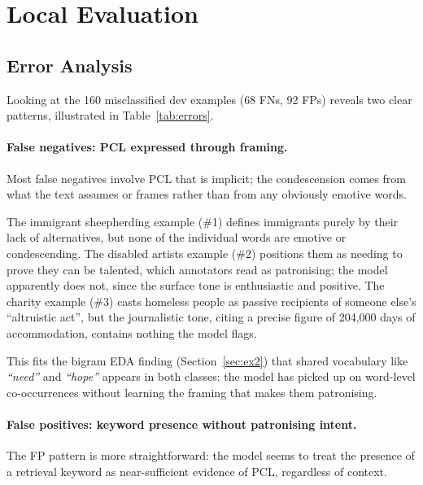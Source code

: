 \documentclass[11pt,a4paper]{article}
\begin{document}
\section{Local Evaluation}
\label{sec:ex52}

\subsection{Error Analysis}

Looking at the 160 misclassified dev examples (68 FNs, 92 FPs) reveals two clear patterns, illustrated in Table~\ref{tab:errors}.

\paragraph{False negatives: PCL expressed through framing.} Most false negatives involve PCL that is implicit; the condescension comes from what the text assumes or frames rather than from any obviously emotive words.

The immigrant sheepherding example (\#1) defines immigrants purely by their lack of alternatives, but none of the individual words are emotive or condescending. The disabled artists example (\#2) positions them as needing to prove they can be talented, which annotators read as patronising; the model apparently does not, since the surface tone is enthusiastic and positive. The charity example (\#3) casts homeless people as passive recipients of someone else's ``altruistic act'', but the journalistic tone, citing a precise figure of 204,000 days of accommodation, contains nothing the model flags.

This fits the bigram EDA finding (Section~\ref{sec:ex2}) that shared vocabulary like \textit{``need''} and \textit{``hope''} appears in both classes: the model has picked up on word-level co-occurrences without learning the framing that makes them patronising.

\paragraph{False positives: keyword presence without patronising intent.} The FP pattern is more straightforward: the model seems to treat the presence of a retrieval keyword as near-sufficient evidence of PCL, regardless of context.
\end{document}
